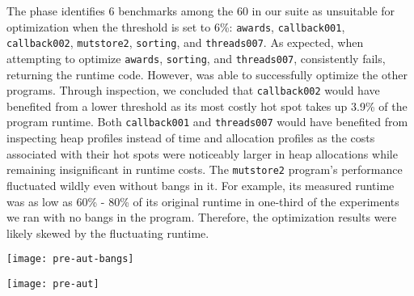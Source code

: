 The \preopt{} phase identifies 6 benchmarks among the 60 in our suite
as unsuitable for optimization when the \hotspotcost{}
threshold is set to 6\%:  \texttt{awards}, \texttt{callback001},
\texttt{callback002}, \texttt{mutstore2}, \texttt{sorting}, and \texttt{threads007}. As
expected, when attempting to
optimize \texttt{awards}, \texttt{sorting},
and \texttt{threads007}, \Ao{} consistently fails, returning
the \unimp{} runtime code. However, \Ao{} was able to
successfully optimize the other programs. Through inspection, we
concluded that \texttt{callback002} would have benefited from a
lower \hotspotcost{} threshold as its most costly hot spot takes up
3.9\% of the program runtime. Both \texttt{callback001}
and \texttt{threads007} would have benefited from inspecting heap
profiles instead of time and allocation profiles as the costs
associated with their hot spots were noticeably larger in heap
allocations while remaining insignificant in runtime
costs. The \texttt{mutstore2} program's performance fluctuated wildly
even without bangs in it. For example, its measured runtime was as low
as 60\% - 80\% of its original runtime in one-third of the experiments
we ran with no bangs in the program. Therefore, the optimization
results were likely skewed by the fluctuating runtime.

\begin{figure*}
\texttt{[image: pre-aut-bangs]}
\label{fig:preopt-bangs}
\end{figure*}

\begin{figure*}
\texttt{[image: pre-aut]}
\label{fig:preopt-runtime}
\end{figure*}


